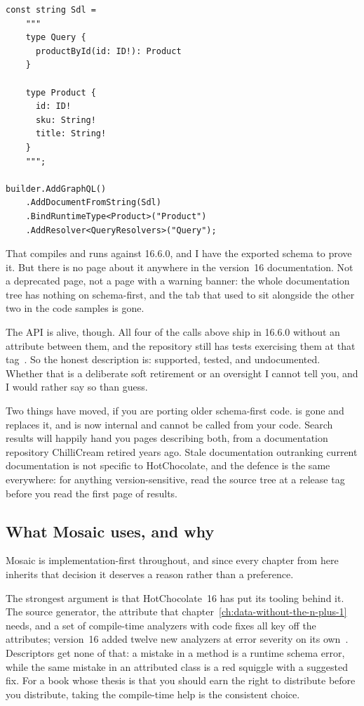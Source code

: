 \begin{verbatim}
const string Sdl =
    """
    type Query {
      productById(id: ID!): Product
    }

    type Product {
      id: ID!
      sku: String!
      title: String!
    }
    """;

builder.AddGraphQL()
    .AddDocumentFromString(Sdl)
    .BindRuntimeType<Product>("Product")
    .AddResolver<QueryResolvers>("Query");
\end{verbatim}

That compiles and runs against 16.6.0, and I have the exported schema to prove
it. But there is no page about it anywhere in the version~16 documentation. Not
a deprecated page, not a page with a warning banner: the whole documentation
tree has nothing on schema-first, and the tab that used to sit alongside the
other two in the code samples is gone.

The API is alive, though. All four of the calls above ship in 16.6.0 without an
\code{[Obsolete]} attribute between them, and the repository still has tests
exercising them at that tag~\autocite{chillicream2026source}. So the honest
description is: supported, tested, and undocumented. Whether that is a
deliberate soft retirement or an oversight I cannot tell you, and I would
rather say so than guess.

Two things have moved, if you are porting older schema-first code.
 is gone and  replaces it, and
 is now internal and cannot be called from your
code. Search results will happily hand you pages describing both, from a
documentation repository ChilliCream retired years ago. Stale documentation
outranking current documentation is not specific to HotChocolate, and the
defence is the same everywhere: for anything version-sensitive, read the source
tree at a release tag before you read the first page of results.

\subsection*{What Mosaic uses, and why}

Mosaic is implementation-first throughout, and since every chapter from here
inherits that decision it deserves a reason rather than a preference.

%
The strongest argument is that HotChocolate~16 has put its tooling behind it.
The source generator, the \code{[DataLoader]} attribute that
chapter~\ref{ch:data-without-the-n-plus-1} needs, and a set of compile-time
analyzers with code fixes all key off the attributes; version~16 added twelve
new analyzers at error severity on its own~\autocite{chillicream2026migrate16}.
Descriptors get none of that: a mistake in a  method is a
runtime schema error, while the same mistake in an attributed class is a red
squiggle with a suggested fix. For a book whose thesis is that you should earn
the right to distribute before you distribute, taking the compile-time help is
the consistent choice.

